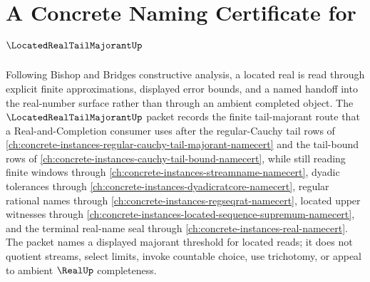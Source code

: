 \chapter{A Concrete Naming Certificate for $\LocatedRealTailMajorantUp$}
\label{ch:concrete-instances-located-real-tail-majorant-namecert}

Following Bishop and Bridges constructive analysis, a located real is read through explicit finite approximations, displayed error bounds, and a named handoff into the real-number surface rather than through an ambient completed object. The $\LocatedRealTailMajorantUp$ packet records the finite tail-majorant route that a Real-and-Completion consumer uses after the regular-Cauchy tail rows of \autoref{ch:concrete-instances-regular-cauchy-tail-majorant-namecert} and the tail-bound rows of \autoref{ch:concrete-instances-cauchy-tail-bound-namecert}, while still reading finite windows through \autoref{ch:concrete-instances-streamname-namecert}, dyadic tolerances through \autoref{ch:concrete-instances-dyadicratcore-namecert}, regular rational names through \autoref{ch:concrete-instances-regseqrat-namecert}, located upper witnesses through \autoref{ch:concrete-instances-located-sequence-supremum-namecert}, and the terminal real-name seal through \autoref{ch:concrete-instances-real-namecert}. The packet names a displayed majorant threshold for located reads; it does not quotient streams, select limits, invoke countable choice, use trichotomy, or appeal to ambient $\RealUp$ completeness.

